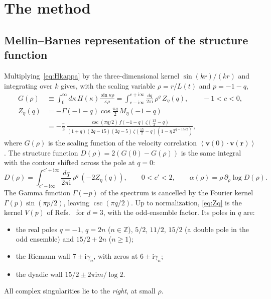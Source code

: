 \documentclass[aip,pof,preprint,floatfix,nofootinbib,amsmath,amssymb]{revtex4-2}
\def\I{\mathrm{i}}
\def\VEV#1{\left\langle #1 \right\rangle}
\newcommand{\vect}[1]{\boldsymbol{#1}}
\begin{document}
\section{The method}\label{sec:method}

\subsection{Mellin--Barnes representation of the structure function}

Multiplying~\eqref{eq:Hkappa} by the three-dimensional kernel $\sin(k r)/(k r)$ and integrating over $k$ gives, with the
scaling variable $\rho=r/L(t)$ and $p=-1-q$,
\begin{align}
    G(\rho)&\equiv\int_0^\infty d\kappa\,H(\kappa)\frac{\sin\kappa\rho}{\kappa\rho}
    =\int_{c-\I\infty}^{c+\I\infty}\frac{dq}{2\pi\I}\,\rho^{q}\,Z_\eta(q),\qquad -1<c<0,\label{eq:Grho}\\
    Z_\eta(q)&=-\Gamma(-1-q)\cos\frac{\pi q}{2}\,M_\eta(-1-q)\nonumber\\
    &=-\frac{\pi}{2}\,\frac{\csc(\pi q/2)\,f(-1-q)\,\zeta\!\left(\frac{13}{2}-q\right)}
    {(1+q)(2q-15)(2q-5)\,\zeta\!\left(\frac{15}{2}-q\right)\left(1-\eta\,2^{q-15/2}\right)} ,
    \label{eq:Zq}
\end{align}
where $G(\rho)$ is the scaling function of the velocity correlation $\VEV{\vect v(0)\cdot\vect v(\vect r)}$.
The structure function $D(\rho)=2\left(G(0)-G(\rho)\right)$ is the same
integral with the contour shifted across the pole at $q=0$:
\begin{equation}
    D(\rho)=\int_{c'-\I\infty}^{c'+\I\infty}\frac{dq}{2\pi\I}\,\rho^{q}\,\left(-2Z_\eta(q)\right),\qquad 0<c'<2,
    \qquad \alpha(\rho)=\rho\,\partial_\rho\log D(\rho).
    \label{eq:Drho}
\end{equation}
The Gamma function $\Gamma(-p)$ of the spectrum is cancelled by the Fourier kernel $\Gamma(p)\sin(\pi p/2)$, leaving
$\csc(\pi q/2)$. Up to normalization, \eqref{eq:Zq} is the kernel $V(p)$ of Refs.~ for
$d=3$, with the odd-ensemble factor. Its poles in $q$ are:
\begin{itemize}
\item the real poles $q=-1$, $q=2n$ ($n\in\mathbb Z$), $5/2$, $11/2$, $15/2$ (a double pole in the odd ensemble) and $15/2+2n$
($n\ge1$);
\item the Riemann wall $7\pm\I\gamma_n$, with zeros at $6\pm\I\gamma_n$;
\item the dyadic wall $15/2\pm2\pi\I m/\log2$.
\end{itemize}
All complex singularities lie to the \emph{right}, at small $\rho$.
\end{document}
